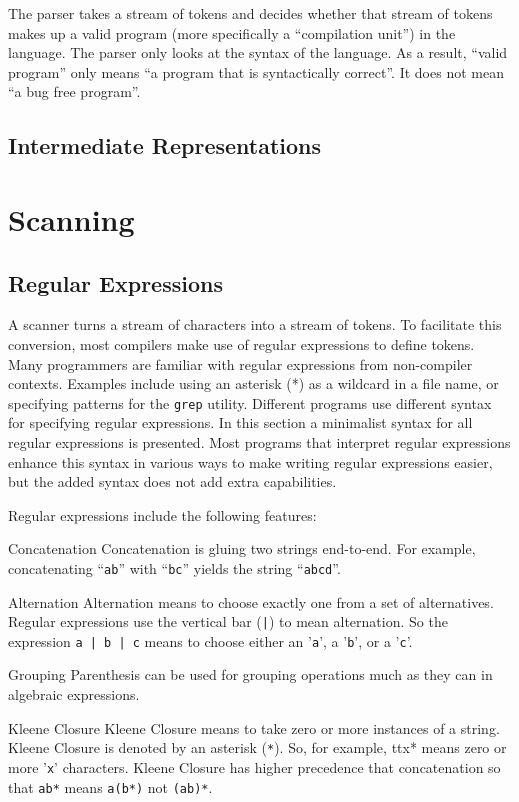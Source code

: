 \documentclass[letterpaper,12pt,openany,reqno]{book}%
\newcommand{\code}[1] {\lstinline[breaklines=yes,breakatwhitespace=yes]{#1}}
\newenvironment{mydesc}[1][9em]
  {
     \begin{basedescript}
     {
      \renewcommand{\makelabel}[1]{\bfseries##1}
      \desclabelwidth{ #1 }
      \desclabelstyle{\multilinelabel}
     }
  }
  {
     \end{basedescript}%
  }
\begin{document}
The parser takes a stream of tokens and decides whether that stream of tokens makes up a valid program (more specifically a ``compilation unit'') in the language. The parser only looks at the syntax of the language. As a result, ``valid program'' only means ``a program that is syntactically correct''. It does not mean ``a bug free program''.

\chapter{Intermediate Representations} \label{chapter.IR}

\part{Scanning} \label{part.scanner}

\chapter{Regular Expressions}

A scanner turns a stream of characters into a stream of tokens. To facilitate this conversion, most compilers make use of regular expressions to define tokens. Many programmers are familiar with regular expressions from non-compiler contexts. Examples include using an asterisk (*) as a wildcard in a file name, or specifying patterns for the \code{grep} utility. Different programs use different syntax for specifying regular expressions. In this section a minimalist syntax for all regular expressions is presented. Most programs that interpret regular expressions enhance this syntax in various ways to make writing regular expressions easier, but the added syntax does not add extra capabilities.

Regular expressions include the following features:
\begin{mydesc}[10em]
	\item[Concatenation] Concatenation is gluing two strings end-to-end. For example, concatenating ``\texttt{ab}'' with ``\texttt{bc}'' yields the string ``\texttt{abcd}''.
  \item[Alternation] Alternation means to choose exactly one from a set of alternatives. Regular expressions use the vertical bar (\texttt{|}) to mean alternation. So the expression \texttt{a | b | c} means to choose either an '\texttt{a}', a '\texttt{b}', or a '\texttt{c}'.
	\item[Grouping] Parenthesis can be used for grouping operations much as they can in algebraic expressions.
	\item[Kleene Closure] Kleene Closure means to take zero or more instances of a string. Kleene Closure is denoted by an asterisk (\texttt{*}). So, for example, tt{x*} means zero or more '\texttt{x}' characters. Kleene Closure has higher precedence that concatenation so that \texttt{ab*} means \texttt{a(b*)} not \texttt{(ab)*}.
\end{mydesc}
\end{document}
